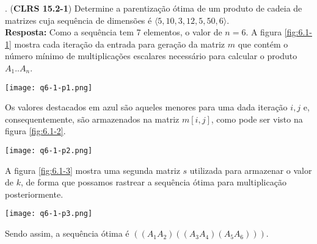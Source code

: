 
. (\textbf{CLRS 15.2-1}) Determine a parentização ótima de um produto de cadeia de matrizes cuja sequência de dimensões é $\langle 5, 10, 3, 12, 5, 50, 6 \rangle$.\\[6pt]
\textbf{Resposta:} Como a sequência tem 7 elementos, o valor de $n = 6$. A figura \ref{fig:6.1-1} mostra cada iteração da entrada para geração da matriz $m$ que contém o número mínimo de multiplicações escalares necessário para calcular o produto $A_1..A_n$.

\begin{center}
\texttt{[image: q6-1-p1.png]}
\label{fig:6.1-1}
\end{center}

Os valores destacados em azul são aqueles menores para uma dada iteração $i, j$ e, consequentemente, são armazenados na matriz $m[i, j]$, como pode ser visto na figura \ref{fig:6.1-2}.
\begin{center}
\texttt{[image: q6-1-p2.png]}
\label{fig:6.1-2}
\end{center}

A figura \ref{fig:6.1-3} mostra uma segunda matriz $s$ utilizada para armazenar o valor de $k$, de forma que possamos rastrear a sequência ótima para multiplicação posteriormente.
\begin{center}
\texttt{[image: q6-1-p3.png]}
\label{fig:6.1-3}
\end{center}

Sendo assim, a sequência ótima é $( (A_1 A_2) ((A_3 A_4) (A_5 A_6)) )$.